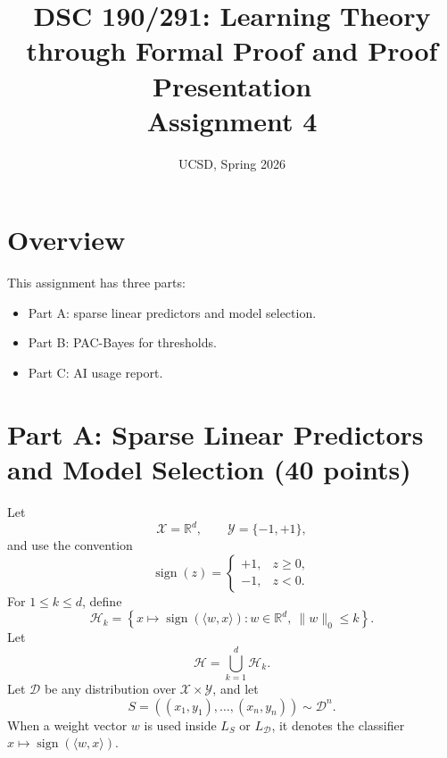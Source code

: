 \documentclass{article}
\title{DSC 190/291: Learning Theory through Formal Proof and Proof Presentation\\Assignment 4}
\date{UCSD, Spring 2026}
\begin{document}
\maketitle

\section{Overview}

This assignment has three parts:
\begin{itemize}
\item Part A: sparse linear predictors and model selection.
\item Part B: PAC-Bayes for thresholds.
\item Part C: AI usage report.
\end{itemize}

\section{Part A: Sparse Linear Predictors and Model Selection (40 points)}

Let
$$
\mathcal{X} = \mathbb{R}^d,
\qquad
\mathcal{Y} = \{-1,+1\},
$$
and use the convention
$$
\operatorname{sign}(z) =
\begin{cases}
+1, & z \ge 0,\\
-1, & z < 0.
\end{cases}
$$
For $1 \le k \le d$, define
$$
\mathcal{H}_k
=
\left\{
x \mapsto \operatorname{sign}(\langle w,x\rangle)
:
w \in \mathbb{R}^d,\ \|w\|_0 \le k
\right\}.
$$
Let
$$
\mathcal{H} = \bigcup_{k=1}^d \mathcal{H}_k.
$$
Let $\mathcal{D}$ be any distribution over $\mathcal{X}\times\mathcal{Y}$, and let
$$
S=((x_1,y_1),\dots,(x_n,y_n)) \sim \mathcal{D}^n.
$$
When a weight vector $w$ is used inside $L_S$ or $L_{\mathcal{D}}$, it denotes the classifier
$x \mapsto \operatorname{sign}(\langle w,x\rangle)$.
\end{document}
